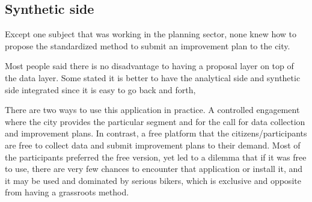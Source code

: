 \subsection{Synthetic side}
\item Except one subject that was working in the planning sector, none knew how to propose the standardized method to submit an improvement plan to the city.  
\item Most people said there is no disadvantage to having a proposal layer on top of the data layer. Some stated it is better to have the analytical side and synthetic side integrated since it is easy to go back and forth, 
\item There are two ways to use this application in practice. A controlled engagement where the city provides the particular segment and for the call for data collection and improvement plans. In contrast, a free platform that the citizens/participants are free to collect data and submit improvement plans to their demand. Most of the participants preferred the free version, yet led to a dilemma that if it was free to use, there are very few chances to encounter that application or install it, and it may be used and dominated by serious bikers, which is exclusive and opposite from having a grassroots method.

